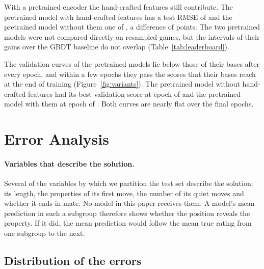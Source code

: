 \documentclass[11pt]{article}
\begin{document}
With a pretrained encoder the hand-crafted features still contribute. The
pretrained model with hand-crafted features has a test RMSE of
 and the pretrained model
without them one of , a
difference of  points.
The two pretrained models were not compared directly on resampled games, but
the intervals of their gains over the GBDT baseline do not overlap
(Table~\ref{tab:leaderboard}).

The validation curves of the pretrained models lie below those of their
bases after every epoch, and within a few epochs they pass the scores that
their bases reach at the end of training (Figure~\ref{fig:variants}). The
pretrained model without hand-crafted features had its best validation score
at epoch  of
 and the pretrained model with
them at epoch  of
. Both curves are nearly
flat over the final epochs.
\fi




\fi

\section{Error Analysis}
\label{sec:error}



\iflook
\paragraph{Variables that describe the solution.}
Several of the variables by which we partition the test set describe the
solution: its length, the properties of its first move, the number of its
quiet moves and whether it ends in mate. No model in this paper receives
them. A model's mean prediction in such a subgroup therefore shows whether
the position reveals the property. If it did, the mean prediction would
follow the mean true rating from one subgroup to the next.

\subsection{Distribution of the errors}
\end{document}

